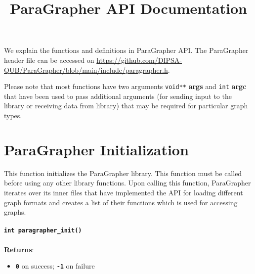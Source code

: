 \documentclass[a4paper]{article}
\title{\huge{ParaGrapher API Documentation}}
\begin{document}
\maketitle

We explain the functions and definitions in ParaGrapher API. 
The ParaGrapher header file can be accessed on \url{https://github.com/DIPSA-QUB/ParaGrapher/blob/main/include/paragrapher.h}.

Please note that most functions have two arguments \verb|void**|  \textbf{args} and \verb|int| \textbf{argc} that
have been used to pass additional arguments (for sending input to the library or 
receiving data from library) that may be required for particular graph types. 

\section{ParaGrapher Initialization}
This function initializes the ParaGrapher library. This function must be called before using any other library functions.
Upon calling this function, ParaGrapher iterates over its inner files that have implemented
the API for loading different graph formats and creates a list of their functions which 
is used for accessing graphs.
\\
\\
\textbf{\texttt{int paragrapher\_init()}}
\\
\\
\textbf{Returns}:
\begin{itemize}
    \setlength{\itemsep}{0pt}
    \setlength{\parskip}{0pt}
    \setlength{\parsep}{0pt}

    \item \textbf{\texttt{0}} on success;  \textbf{\texttt{-1}} on failure
\end{itemize}


\end{document}
